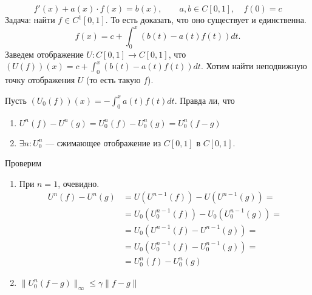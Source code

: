 \begin{ex}
    $$ f'(x) + a(x) \cdot f(x) = b(x), \qquad a, b \in C[0, 1], \quad f(0) = c $$
    Задача: найти $ f \in C^{1}[0, 1]$. То есть доказать, что оно существует и единственна.
    \[
	f(x) = c + \int_{0}^{x} \left( b(t) - a(t) f(t) \right) dt
    .\]
    Заведем отображение $U : C[0, 1] \to  C[0,1]$, что $ (U(f))(x) =c+ \int_{0}^{x} \left( b(t) - a(t) f(t) \right) dt $.
    Хотим найти неподвижную точку отображения $ U$ (то есть такую $ f$).

    Пусть $ (U_0(f))(x) = - \int_{0}^{x} a(t)f(t) dt $.
    Правда ли, что
    \begin{enumerate}
	\item $ U^{n}(f) - U^{n}(g) = U_0^{n}(f) - U_0^{n} (g) = U_0^{n}(f-g)$
	\item $ \exists  n\colon U_0^{n}$ --- сжимающее отображение из $ C[0,1]$ в  $ C[0, 1]$.
    \end{enumerate}
    Проверим
    \begin{enumerate}
	\item При $ n=1$, очевидно.
	    \begin{align*}
		U^{n}(f) - U^{n}(g) &= U\left( U^{n-1}(f)\right) -U \left( U^{n-1}(g) \right)  =\\
				    & = U_0 \left( U_0^{n-1}(f) \right) - U_0(U_0^{n-1}(g)) =
				    \\
				    &=U_0\left( U^{n-1}(f) - U^{n-1}(g) \right) =\\
				    &=U_0\left( U_0^{n-1} (f) - U_0^{n-1}(g)  \right) =\\
				    &=U_0^{n}(f) - U_0^{n}(g)
	    \end{align*}
	\item $ \| U_0^{n}(f-g) \|_{\infty} \le \gamma \| f-g  \|  $


\end{enumerate}
\end{ex}
